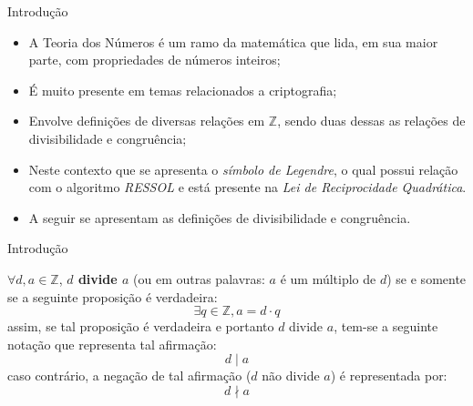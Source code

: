 \begin{frame}{Introdução}
    \begin{itemize}
        \item A Teoria dos Números é um ramo da matemática que lida, em sua maior parte, com  propriedades de números inteiros;
        \item É muito presente em temas relacionados a criptografia;
        \item Envolve definições de diversas relações em $\mathbb{Z}$, sendo duas dessas as relações de divisibilidade e congruência;
        \item Neste contexto que se apresenta o \textit{símbolo de Legendre}, o qual possui relação com o algoritmo \textit{RESSOL} e está presente na \textit{Lei de Reciprocidade Quadrática}.
        \item A seguir se apresentam as definições de divisibilidade e congruência.
    \end{itemize}
\end{frame}

\begin{frame}{Introdução}
    \begin{definicao}
            $\forall d, a \in \mathbb{Z}$, \textbf{$d$ divide $a$} (ou em outras palavras: $a$ é um múltiplo de $d$) se e somente se a seguinte proposição é verdadeira:
            \begin{equation*}
                \exists q \in \mathbb{Z}, a = d \cdot q
            \end{equation*}
            assim, se tal proposição é verdadeira e portanto $d$ divide $a$, tem-se a seguinte notação que representa tal afirmação:
            \begin{equation*}
                d \mid a
            \end{equation*}
            caso contrário, a negação de tal afirmação ($d$ não divide $a$) é representada por:
            \begin{equation*}
                d \nmid a
            \end{equation*}
    \end{definicao}
\end{frame}

